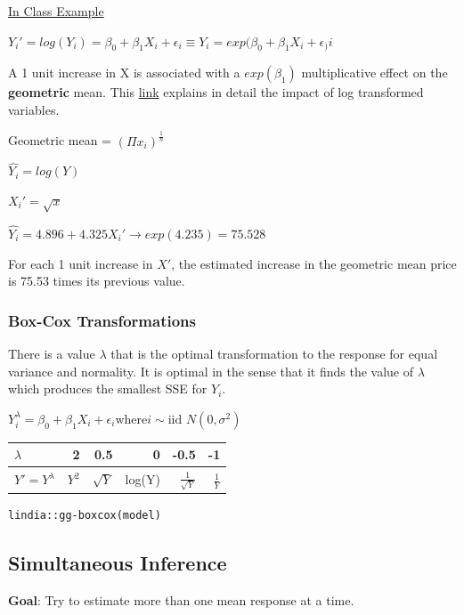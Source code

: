 \documentclass[11pt]{article}
\begin{document}
\uline{In Class Example}

\(Y_i' = log(Y_i) = \beta_0 + \beta_1 X_i + \epsilon_i \equiv Y_i = exp(\beta_0 +
\beta_1 X_i + \epsilon_)i\)

A 1 unit increase in X is associated with a \(exp(\beta_1)\) multiplicative effect
on the \textbf{geometric} mean. This \href{https://stats.idre.ucla.edu/other/mult-pkg/faq/general/faqhow-do-i-interpret-a-regression-model-when-some-variables-are-log-transformed/}{link} explains in detail the impact of log
transformed variables.

Geometric mean = \((\Pi x_i)^\frac{1}{n}\)

\(\hat{Y_i} = log(Y)\)

\(X_i' = \sqrt{x}\)

\(\hat{Y_i} = 4.896 + 4.325 X_i' \to exp(4.235) = 75.528\)

For each 1 unit increase in \(X'\), the estimated increase in the geometric mean
price is 75.53 times its previous value.

\subsubsection{Box-Cox Transformations}
\label{sec:org5f5fce4}
There is a value \(\lambda\) that is the optimal transformation to the response
for equal variance and normality. It is optimal in the sense that it finds the
value of \(\lambda\) which produces the smallest SSE for \(Y_i\).

\(Y_i^{\lambda} = \beta_0 + \beta_1 X_i + \epsilon_i \text{where} i \sim
\text{iid } N(0,
\sigma^2)\)

\begin{center}
\begin{tabular}{lrrrrr}
\(\lambda\) & 2 & 0.5 & 0 & -0.5 & -1\\
\hline
\(Y' = Y^{\lambda}\) & \(Y^2\) & \(\sqrt{Y}\) & log(Y) & \(\frac{1}{\sqrt{Y}}\) & \(\frac{1}{Y}\)\\
\end{tabular}
\end{center}

\begin{verbatim}
lindia::gg-boxcox(model)
\end{verbatim}

\subsection{Simultaneous Inference}
\label{sec:org1b53326}
\textbf{Goal}: Try to estimate more than one mean response at a time.
\end{document}
